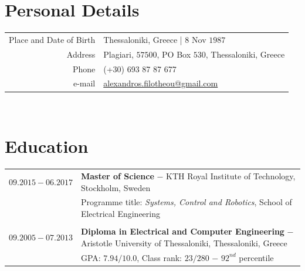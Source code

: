 \documentclass[a4paper,10pt,twoside]{article}
\begin{document}


\par{\bigskip\par}
\vspace{1cm}

\section{Personal Details}

\begin{tabular}{rp{10cm}}
Place and Date of Birth 	& Thessaloniki, Greece | $8$ Nov $1987$ \\
Address            			  & Plagiari, $57500$, PO Box $530$, Thessaloniki, Greece \\
Phone						          & (+30) 693 87 87 677 \\
e-mail                    & \href{mailto:alexandros.filotheou@gmail.com}{alexandros.filotheou@gmail.com}
\end{tabular}\\


\section{Education}

\begin{tabular}{rp{12cm}}
$09.2015 - 06.2017$ & \textbf{Master of Science} $-$ KTH Royal Institute of Technology, Stockholm, Sweden\\
             & Programme title: \textit{Systems, Control and Robotics}, School of Electrical Engineering \\

&\\
$09.2005 - 07.2013$ & \textbf{Diploma in Electrical and Computer Engineering} $-$ Aristotle University of Thessaloniki, Thessaloniki, Greece \\
                    & GPA: $7.94 / 10.0$, Class rank: $23 / 280$ $-$ $92^{nd}$ percentile \\
\end{tabular}\\
\end{document}
